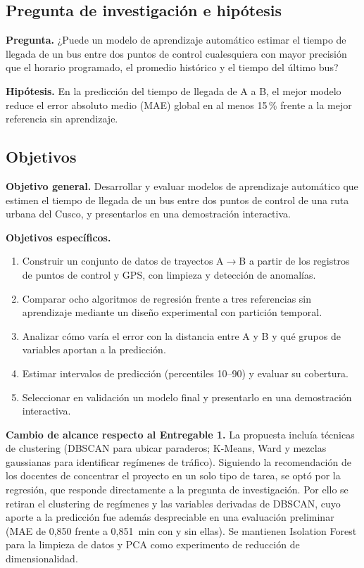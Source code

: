 \documentclass[conference,a4paper]{IEEEtran}
\begin{document}
\subsection{Pregunta de investigación e hipótesis}
\textbf{Pregunta.} ¿Puede un modelo de aprendizaje automático estimar el tiempo de llegada de un bus entre dos puntos de control cualesquiera con mayor precisión que el horario programado, el promedio histórico y el tiempo del último bus?

\textbf{Hipótesis.} En la predicción del tiempo de llegada de A a B, el mejor modelo reduce el error absoluto medio (MAE) global en al menos 15\,\% frente a la mejor referencia sin aprendizaje.

\subsection{Objetivos}
\textbf{Objetivo general.} Desarrollar y evaluar modelos de aprendizaje automático que estimen el tiempo de llegada de un bus entre dos puntos de control de una ruta urbana del Cusco, y presentarlos en una demostración interactiva.

\textbf{Objetivos específicos.}
\begin{enumerate}
\item Construir un conjunto de datos de trayectos A$\to$B a partir de los registros de puntos de control y GPS, con limpieza y detección de anomalías.
\item Comparar ocho algoritmos de regresión frente a tres referencias sin aprendizaje mediante un diseño experimental con partición temporal.
\item Analizar cómo varía el error con la distancia entre A y B y qué grupos de variables aportan a la predicción.
\item Estimar intervalos de predicción (percentiles 10--90) y evaluar su cobertura.
\item Seleccionar en validación un modelo final y presentarlo en una demostración interactiva.
\end{enumerate}

\textbf{Cambio de alcance respecto al Entregable 1.} La propuesta incluía técnicas de clustering (DBSCAN para ubicar paraderos; K-Means, Ward y mezclas gaussianas para identificar regímenes de tráfico). Siguiendo la recomendación de los docentes de concentrar el proyecto en un solo tipo de tarea, se optó por la regresión, que responde directamente a la pregunta de investigación. Por ello se retiran el clustering de regímenes y las variables derivadas de DBSCAN, cuyo aporte a la predicción fue además despreciable en una evaluación preliminar (MAE de 0,850 frente a 0,851~min con y sin ellas). Se mantienen Isolation Forest para la limpieza de datos y PCA como experimento de reducción de dimensionalidad.
\end{document}

